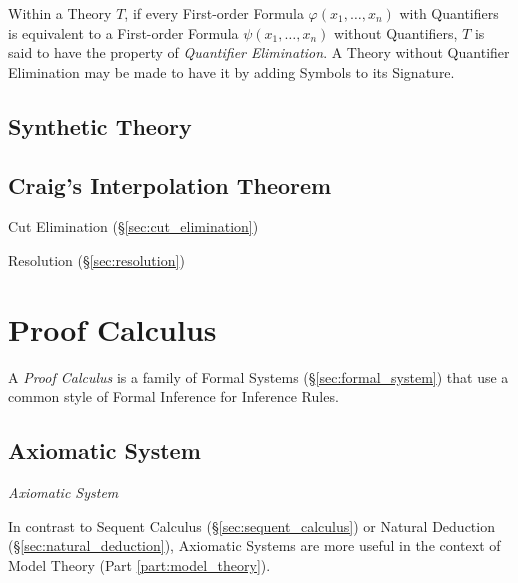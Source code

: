 Within a Theory $T$, if every First-order Formula $\varphi(x_1,
\ldots, x_n)$ with Quantifiers is equivalent to a First-order Formula
$\psi(x_1, \ldots, x_n)$ without Quantifiers, $T$ is said to have the
property of \emph{Quantifier Elimination}. A Theory without Quantifier
Elimination may be made to have it by adding Symbols to its Signature.



\subsection{Synthetic Theory}\label{sec:synthetic_theory}

\subsection{Craig's Interpolation Theorem}
\label{sec:interpolation_theorem}

Cut Elimination (\S\ref{sec:cut_elimination})

Resolution (\S\ref{sec:resolution})



\section{Proof Calculus}\label{sec:proof_calculus}

A \emph{Proof Calculus} is a family of Formal Systems
(\S\ref{sec:formal_system}) that use a common style of Formal
Inference for Inference Rules.



\subsection{Axiomatic System} \label{sec:axiomatic_system}

\emph{Axiomatic System}

In contrast to Sequent Calculus (\S\ref{sec:sequent_calculus}) or
Natural Deduction (\S\ref{sec:natural_deduction}), Axiomatic Systems
are more useful in the context of Model Theory (Part
\ref{part:model_theory}).



